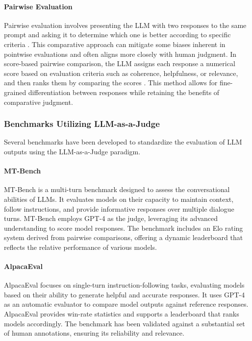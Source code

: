 \documentclass[sigconf, authoryear]{acmart}
\begin{document}
\paragraph{Pairwise Evaluation}


Pairwise evaluation involves presenting the LLM with two responses to the same prompt and asking it to determine which one is better according to specific criteria \cite{liusie2024llmcomparativeassessmentzeroshot}.
This comparative approach can mitigate some biases inherent in pointwise evaluations and often aligns more closely with human judgment.
In score-based pairwise comparison, the LLM assigns each response a numerical score based on evaluation criteria such as coherence, helpfulness, or relevance, and then ranks them by comparing the scores \cite{liu2024aligning}.
This method allows for fine-grained differentiation between responses while retaining the benefits of comparative judgment.

\subsubsection{Benchmarks Utilizing LLM-as-a-Judge}


Several benchmarks have been developed to standardize the evaluation of LLM outputs using the LLM-as-a-Judge paradigm.

\paragraph{MT-Bench}


MT-Bench is a multi-turn benchmark designed to assess the conversational abilities of LLMs.
It evaluates models on their capacity to maintain context, follow instructions, and provide informative responses over multiple dialogue turns.
MT-Bench employs GPT-4 as the judge, leveraging its advanced understanding to score model responses.
The benchmark includes an Elo rating system derived from pairwise comparisons, offering a dynamic leaderboard that reflects the relative performance of various models\cite{mtbench}.

\paragraph{AlpacaEval}


AlpacaEval focuses on single-turn instruction-following tasks, evaluating models based on their ability to generate helpful and accurate responses.
It uses GPT-4 as an automatic evaluator to compare model outputs against reference responses.
AlpacaEval provides win-rate statistics and supports a leaderboard that ranks models accordingly.
The benchmark has been validated against a substantial set of human annotations, ensuring its reliability and relevance\cite{alpaca_eval}.
\end{document}
